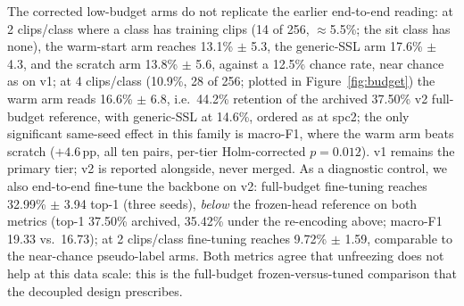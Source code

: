 The corrected low-budget arms do not replicate the earlier end-to-end reading: at 2 clips/class where a class has training clips (14 of 256, $\approx$5.5\%; the sit class has none), the warm-start arm reaches 13.1\% $\pm$ 5.3, the generic-SSL arm 17.6\% $\pm$ 4.3, and the scratch arm 13.8\% $\pm$ 5.6, against a 12.5\% chance rate, near chance as on v1; at 4 clips/class (10.9\%, 28 of 256; plotted in Figure~\ref{fig:budget}) the warm arm reads 16.6\% $\pm$ 6.8, i.e.\ 44.2\% retention of the archived 37.50\% v2 full-budget reference, with generic-SSL at 14.6\%, ordered as at spc2; the only significant same-seed effect in this family is macro-F1, where the warm arm beats scratch ($+4.6$\,pp, all ten pairs, per-tier Holm-corrected $p=0.012$). v1 remains the primary tier; v2 is reported alongside, never merged. As a diagnostic control, we also end-to-end fine-tune the backbone on v2: full-budget fine-tuning reaches 32.99\% $\pm$ 3.94 top-1 (three seeds), \emph{below} the frozen-head reference on both metrics (top-1 37.50\% archived, 35.42\% under the re-encoding above; macro-F1 19.33 vs.\ 16.73); at 2 clips/class fine-tuning reaches 9.72\% $\pm$ 1.59, comparable to the near-chance pseudo-label arms. Both metrics agree that unfreezing does not help at this data scale: this is the full-budget frozen-versus-tuned comparison that the decoupled design prescribes.

